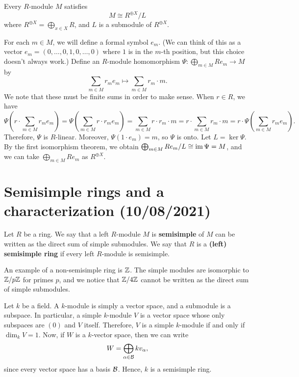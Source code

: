 \begin{prop}{}
    Every $R$-module $M$ satisfies 
    \[ M \cong R^{\oplus X}/L \] 
    where $R^{\oplus X} = \bigoplus_{x \in X} R$, and $L$ is a submodule of 
    $R^{\oplus X}$. 
\end{prop}
\begin{pf}
    For each $m \in M$, we will define a formal symbol $e_m$. 
    (We can think of this as a vector $e_m = (0, \dots, 0, 1, 0, \dots, 0)$ 
    where $1$ is in the $m$-th position, but this choice doesn't always work.)
    Define an $R$-module homomorphism $\Psi : \bigoplus_{m \in M} Re_m \to M$ by 
    \[ \sum_{m \in M} r_m e_m \mapsto \sum_{m \in M} r_m \cdot m. \] 
    We note that these must be finite sums in order to make sense. When $r \in R$, 
    we have 
    \[ \Psi\left(r \cdot \sum_{m \in M} r_m e_m \right) 
        = \Psi\left( \sum_{m \in M} r \cdot r_m e_m \right) 
        = \sum_{m \in M} r \cdot r_m \cdot m 
        = r \cdot \sum_{m \in M} r_m \cdot m 
        = r \cdot \Psi \left( \sum_{m \in M} r_m e_m \right). \] 
    Therefore, $\Psi$ is $R$-linear. Moreover, $\Psi(1 \cdot e_m) = m$, so 
    $\Psi$ is onto. Let $L = \ker\Psi$. By the first isomorphism theorem, 
    we obtain $\bigoplus_{m \in M} Re_m/L \cong \operatorname{im}\Psi = M$, 
    and we can take  $\bigoplus_{m \in M} Re_m$ as $R^{\oplus X}$. 
\end{pf}

\section{Semisimple rings and a characterization (10/08/2021)}

\begin{defn}{}
    Let $R$ be a ring. We say that a left $R$-module $M$ is {\bf semisimple} 
    of $M$ can be written as the direct sum of simple submodules. We say that 
    $R$ is a {\bf (left) semisimple ring} if every left $R$-module is semisimple.
\end{defn}

\begin{exmp}{}
    An example of a non-semisimple ring is $\mathbb{Z}$. The simple modules are 
    isomorphic to $\mathbb{Z}/p\mathbb{Z}$ for primes $p$, and we notice that 
    $\mathbb{Z}/4\mathbb{Z}$ cannot be written as the direct sum of simple submodules. 
\end{exmp}

\begin{exmp}{}
    Let $k$ be a field. A $k$-module is simply a vector space, and a 
    submodule is a subspace. In particular, a simple $k$-module $V$ is a vector 
    space whose only subspaces are $(0)$ and $V$ itself. Therefore, $V$ 
    is a simple $k$-module if and only if $\dim_k V = 1$. Now, if 
    $W$ is a $k$-vector space, then we can write 
    \[ W = \bigoplus_{\alpha \in {\cal B}} kv_\alpha, \] 
    since every vector space has a basis ${\cal B}$. Hence, $k$ is a semisimple ring. 
\end{exmp}

